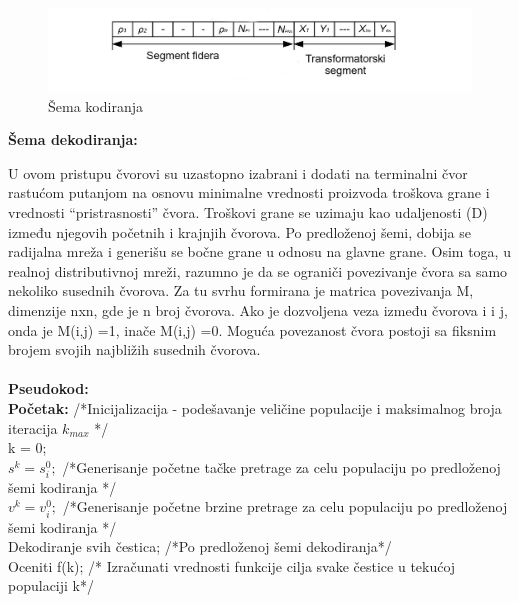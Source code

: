 \documentclass[a4paper]{article}
\begin{document}
\begin{figure}[htp]
    \centering
    \includegraphics[scale=0.3]{foto4.jpg}
    \caption{Šema kodiranja}
    \label{fig:sema_kodiranja}
\end{figure}

\begin{flushleft}
\textbf{Šema dekodiranja:} 
\end{flushleft}

U ovom pristupu čvorovi su uzastopno izabrani i dodati na terminalni čvor rastućom putanjom na osnovu minimalne vrednosti proizvoda troškova grane i vrednosti “pristrasnosti” čvora. Troškovi grane se uzimaju kao udaljenosti (D) između njegovih početnih i krajnjih čvorova. Po predloženoj šemi, dobija se radijalna mreža i generišu se bočne grane u odnosu na glavne grane. Osim toga, u realnoj distributivnoj mreži, razumno je da se ograniči povezivanje čvora sa samo nekoliko susednih čvorova. Za tu svrhu formirana je matrica povezivanja M, dimenzije nxn, gde je n broj čvorova. Ako je dozvoljena veza između čvorova i i j, onda je M(i,j) =1, inače  M(i,j) =0. Moguća povezanost čvora postoji sa fiksnim brojem svojih najbližih susednih čvorova.\\
\\ 
\textbf{Pseudokod:} \\ 
\textbf{Početak:} /*Inicijalizacija - podešavanje veličine populacije i maksimalnog broja iteracija $k_{max}$ */ \\
\hspace*{5mm}k = 0; \\
\hspace*{5mm}$s^k = s_{i}^0;$  /*Generisanje početne tačke pretrage za celu populaciju po predloženoj šemi kodiranja */ \\
\hspace*{5mm}$v^k = v_{i}^0;$  /*Generisanje početne brzine pretrage za celu populaciju po predloženoj šemi kodiranja */ \\
\hspace*{5mm}Dekodiranje svih čestica; /*Po predloženoj šemi dekodiranja*/ \\
\hspace*{5mm}Oceniti f(k); /* Izračunati vrednosti funkcije cilja svake čestice u tekućoj populaciji k*/ \\
\end{document}
